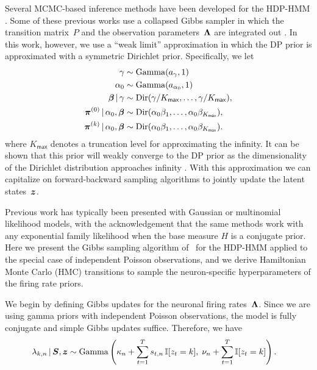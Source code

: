 Several MCMC-based inference methods have been developed for the
HDP-HMM \citep{Teh06,van08}. Some of these previous works use a
collapsed Gibbs sampler in which the transition matrix~$P$ and the
observation parameters~$\boldsymbol{\Lambda}$ are integrated out
\citep{Teh06,van08}. In this work, however, we use a ``weak limit''
approximation in which the DP prior is approximated with a symmetric
Dirichlet prior. Specifically, we let
\begin{align}
\label{eq:hdphmm_trans}
\gamma &\sim \mathrm{Gamma}(a_\gamma, 1) \\
\nonumber \alpha_0 &\sim \mathrm{Gamma}(a_{\alpha_0}, 1) \\
\nonumber \boldsymbol{\beta} \,|\, \gamma &\sim \mathrm{Dir}(\gamma/K_{\mathsf{max}}, \ldots, \gamma/K_{\mathsf{max}}), \\
\nonumber \boldsymbol{\pi}^{(0)} \,|\, \alpha_0, \boldsymbol{\beta} &\sim \mathrm{Dir}(\alpha_0 \beta_1, \ldots, \alpha_0 \beta_{K_{\mathsf{max}}}), \\
\nonumber \boldsymbol{\pi}^{(k)} \,|\, \alpha_0, \boldsymbol{\beta} &\sim \mathrm{Dir}(\alpha_0 \beta_1, \ldots, \alpha_0 \beta_{K_{\mathsf{max}}}).
\end{align}
where $K_{\mathsf{max}}$ denotes a truncation level for approximating the infinity.  It can be
shown that this prior will weakly converge to the DP prior as the
dimensionality of the Dirichlet distribution approaches infinity
\citep{Johnson14, Ishwaran02}. With this approximation we can
capitalize on forward-backward sampling algorithms to jointly update
the latent states~$\boldsymbol{z}$.

Previous work has typically been presented with Gaussian or
multinomial likelihood models, with the acknowledgement that the same
methods work with any exponential family likelihood when the base
measure $H$ is a conjugate prior.  Here we present the Gibbs sampling
algorithm of~\citep{Teh06} for the HDP-HMM applied to the special case
of independent Poisson observations, and we derive Hamiltonian Monte
Carlo (HMC) transitions to sample the neuron-specific hyperparameters of
the firing rate priors.

We begin by defining Gibbs updates for the neuronal firing
rates~$\boldsymbol{\Lambda}$. Since we are using gamma priors with independent
Poisson observations, the model is fully conjugate and simple Gibbs
updates suffice. Therefore, we have
\begin{align*}
\lambda_{k,n} \,|\, \boldsymbol{S}, \boldsymbol{z} 
  &\sim \mathrm{Gamma} \left(
    \kappa_n + \sum_{t=1}^T s_{t,n} \, \mathbb{I}[z_t=k], \; 
    \nu_n + \sum_{t=1}^T \mathbb{I}[z_t=k]
    \right).
\end{align*}

